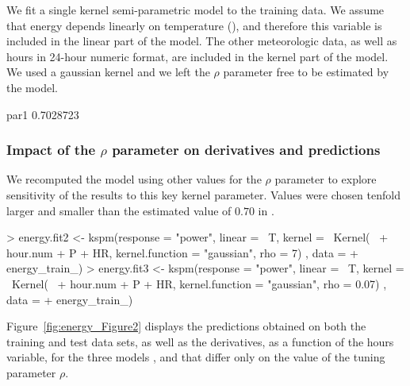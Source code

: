We fit a single kernel semi-parametric model to the training data. We assume that energy depends linearly on temperature (), and therefore this variable is included in the linear part of the model. The other meteorologic data, as well as hours in 24-hour numeric format, are included in the kernel part of the model. We used a gaussian kernel and we left the $\rho$ parameter free to be estimated by the model. 


\begin{example}
     par1 
0.7028723 
\end{example}


\subsubsection[Impact of the rho parameter on derivatives and predictions]{Impact of the $\rho$ parameter on derivatives and predictions} \label{sec:illustrations-energy-impact_rho}

We recomputed the model using other values for the $\rho$ parameter to explore sensitivity of the results to this key kernel parameter. Values were chosen tenfold larger and smaller than the estimated value of $0.70$ in .


\begin{example}
> energy.fit2 <- kspm(response = "power", linear = ~T, kernel = ~Kernel(~
+    hour.num + P + HR, kernel.function = "gaussian", rho = 7) , data =
+    energy_train_)
> energy.fit3 <- kspm(response = "power", linear = ~T, kernel = ~Kernel(~
+    hour.num +  P + HR, kernel.function = "gaussian", rho = 0.07) , data = 
+    energy_train_)
\end{example}


Figure~\ref{fig:energy_Figure2} displays the predictions obtained on both the training and test data sets, as well as the derivatives, as a function of the hours variable, for the three models ,  and  that differ only on the value of the tuning parameter $\rho$. 


